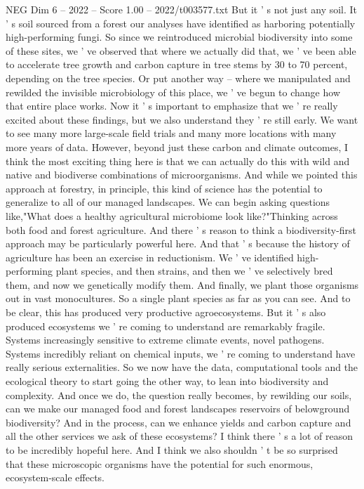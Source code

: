 \begin{textsample}{NEG Dim 6 – 2022 – Score 1.00 – 2022/t003577.txt}
But it ' s not just any soil.
It ' s soil sourced from a forest our analyses have identified as harboring potentially high-performing fungi.
So since we reintroduced microbial biodiversity into some of these sites, we ' ve observed that where we actually did that, we ' ve been able to accelerate tree growth and carbon capture in tree stems by 30 to 70 percent, depending on the tree species.
Or put another way -- where we manipulated and rewilded the invisible microbiology of this place, we ' ve begun to change how that entire place works.
Now it ' s important to emphasize that we ' re really excited about these findings, but we also understand they ' re still early.
We want to see many more large-scale field trials and many more locations with many more years of data.
However, beyond just these carbon and climate outcomes, I think the most exciting thing here is that we can actually do this with wild and native and biodiverse combinations of microorganisms.
And while we pointed this approach at forestry, in principle, this kind of science has the potential to generalize to all of our managed landscapes.
We can begin asking questions like,"What does a healthy agricultural microbiome look like?"Thinking across both food and forest agriculture.
And there ' s reason to think a biodiversity-first approach may be particularly powerful here.
And that ' s because the history of agriculture has been an exercise in reductionism.
We ' ve identified high-performing plant species, and then strains, and then we ' ve selectively bred them, and now we genetically modify them.
And finally, we plant those organisms out in vast monocultures.
So a single plant species as far as you can see.
And to be clear, this has produced very productive agroecosystems.
But it ' s also produced ecosystems we ' re coming to understand are remarkably fragile.
Systems increasingly sensitive to extreme climate events, novel pathogens.
Systems incredibly reliant on chemical inputs, we ' re coming to understand have really serious externalities.
So we now have the data, computational tools and the ecological theory to start going the other way, to lean into biodiversity and complexity.
And once we do, the question really becomes, by rewilding our soils, can we make our managed food and forest landscapes reservoirs of belowground biodiversity?
And in the process, can we enhance yields and carbon capture and all the other services we ask of these ecosystems?
I think there ' s a lot of reason to be incredibly hopeful here.
And I think we also shouldn ' t be so surprised that these microscopic organisms have the potential for such enormous, ecosystem-scale effects.

\end{textsample}
